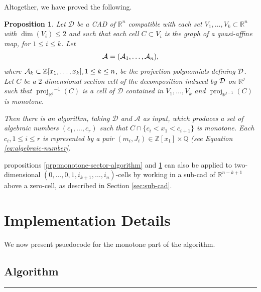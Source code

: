 \documentclass[
]{book}
\newtheorem{proposition}{Proposition}[chapter]
\theoremstyle{definition}
\theoremstyle{definition}
\theoremstyle{definition}
\theoremstyle{definition}
\theoremstyle{remark}
\begin{document}
Altogether, we have proved the following.

\begin{proposition}
\protect\hypertarget{prp:monotone-section-algorithm}{}\label{prp:monotone-section-algorithm}Let \(\mathcal{D}\) be a CAD of \(\mathbb{R}^n\) compatible with each set \(V_1,\ldots,V_k \subset \mathbb{R}^n\) with \(\dim(V_i) \le 2\) and such that each cell \(C \subset V_i\) is the graph of a quasi-affine map, for \(1\le i \le k\). Let
\[
{\cal A} = ({\cal A}_1,\ldots,{\cal A}_n),
\]
where \({\cal A}_k \subset \mathbb{Z}[x_1,\ldots,x_k], 1 \le k \le n\), be the projection polynomials defining \(\cal D\).
Let \(C\) be a \(2\)-dimensional section cell of the decomposition induced by \(\cal D\) on \(\mathbb{R}^{j}\) such that \({\operatorname{proj}_{\mathbb{R}^{j}}}^{-1}(C)\) is a cell of \(\mathcal{D}\) contained in \(V_1,\ldots,V_k\) and \({\operatorname{proj}_{\mathbb{R}^{j-1}}}(C)\) is monotone.

Then there is an algorithm, taking \(\mathcal{D}\) and \(\mathcal{A}\) as input, which produces a set of algebraic numbers \((c_1,\ldots,c_r)\) such that \(C \cap \{ c_i < x_1 < c_{i+1} \}\) is monotone. Each \(c_i, 1 \le i \le r\) is represented by a pair \((m_i, J_i) \in \mathbb{Z}[x_1] \times \mathbb{Q}\) (see Equation \eqref{eq:algebraic-number}.
\end{proposition}

\leavevmode\hypertarget{monotone-sub-cad}{}%
propositions \ref{prp:monotone-sector-algorithm} and \ref{prp:monotone-section-algorithm} can also be applied to two-dimensional \((0,\ldots,0,1,i_{k+1},\ldots,i_n)\)-cells by working in a sub-cad of \(\mathbb{R}^{n-k+1}\) above a zero-cell, as described in Section \ref{sec:sub-cad}.

\hypertarget{implementation-details-1}{%
\section{Implementation Details}\label{implementation-details-1}}

We now present psuedocode for the monotone part of the algorithm.

\hypertarget{sec:monotone-algorithm}{%
\subsection{Algorithm}\label{sec:monotone-algorithm}}

\begin{center}\rule{0.5\linewidth}{0.5pt}\end{center}
\end{document}

